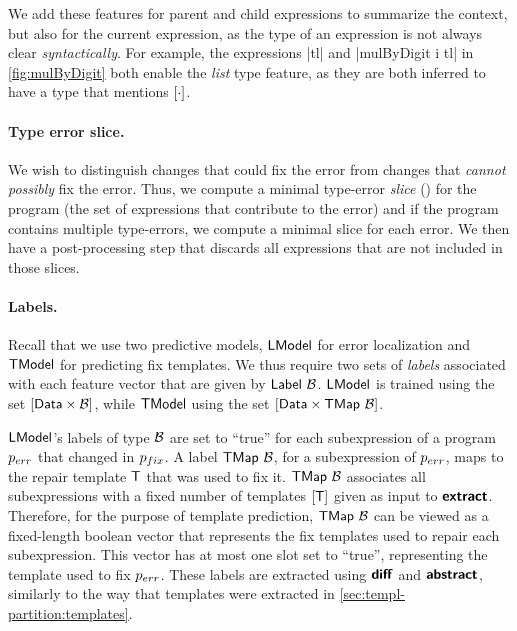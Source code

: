 We add these features for parent and child expressions to summarize the context,
but also for the current expression, as the type of an expression is not always
clear \emph{syntactically}. For example, the expressions |tl| and
|mulByDigit i tl| in \autoref{fig:mulByDigit} both enable the \emph{list} type
feature, as they are both inferred to have a type that mentions $[\cdot]$.

\paragraph{Type error slice.}
We wish to distinguish changes that could fix the error
from changes that \emph{cannot possibly} fix the error. Thus, we compute a
minimal type-error \emph{slice} (\eg \citep{Tip2001-qp,Haack2003-vc}) for the
program (\ie the set of expressions that contribute to the error) and if the
program contains multiple type-errors, we compute a minimal slice for each
error. We then have a post-processing step that discards all expressions that
are not included in those slices.

\paragraph{Labels.}
Recall that we use two predictive models, $\mathsf{LModel}$ for error localization and
$\mathsf{TModel}$ for predicting fix templates. We thus require two sets of
\emph{labels} associated with each feature vector that are given by
$\mathsf{Label}\ \mathcal{B}$. $\mathsf{LModel}$ is trained using the set $[\mathsf{Data} \times
\mathcal{B}]$, while $\mathsf{TModel}$ using the set $[\mathsf{Data} \times
\mathsf{TMap}\ \mathcal{B}]$.

$\mathsf{LModel}$'s labels of type $\mathcal{B}$ are set to ``true'' for each subexpression
of a program $p_{err}$ that changed in $p_{fix}$. A label $\mathsf{TMap}\ \mathcal{B}$, for a
subexpression of $p_{err}$, maps to the repair template $\mathsf{T}$ that was used to fix
it. $\mathsf{TMap}\ \mathcal{B}$ associates all subexpressions with a fixed number of
templates $[\mathsf{T}]$ given as input to $\bm{\mathsf{extract}}$. Therefore, for the
purpose of template prediction, $\mathsf{TMap}\ \mathcal{B}$ can be viewed as a
fixed-length boolean vector that represents the fix templates used to repair
each subexpression. This vector has at most one slot set to ``true'',
representing the template used to fix $p_{err}$. These labels are extracted using
$\bm{\mathsf{diff}}$ and $\bm{\mathsf{abstract}}$, similarly to the way that templates were extracted
in \autoref{sec:templ-partition:templates}.


